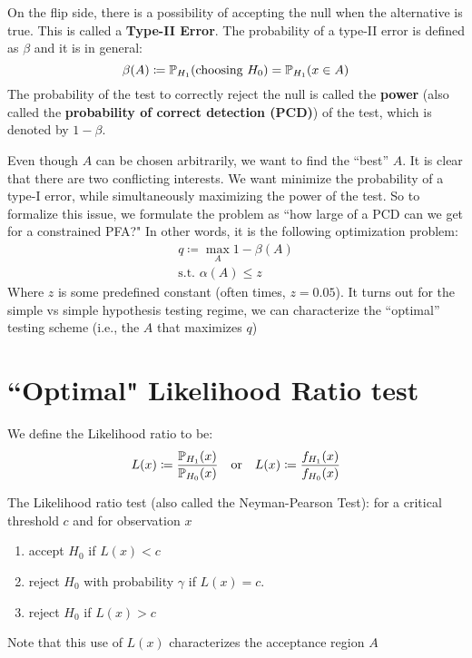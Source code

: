 \documentclass{article}
\begin{document}
On the flip side, there is a possibility of accepting the null when the alternative is true. This is called a \textbf{Type-II Error}. The probability of a type-II error is defined as $\beta$ and it is in general:
\[
\beta(A) \coloneqq \operatorname{\mathbb{P}}_{H_1}(\text{choosing } H_0) = \operatorname{\mathbb{P}}_{H_1}(x \in A)
\]
The probability of the test to correctly reject the null is called the \textbf{power} (also called the \textbf{probability of correct detection (PCD)}) of the test, which is denoted by $1-\beta$.

Even though $A$ can be chosen arbitrarily, we want to find the ``best'' $A$. It is clear that there are two conflicting interests. We want minimize the probability of a type-I error, while simultaneously maximizing the power of the test. So to formalize this issue, we formulate the problem as ``how large of a PCD can we get for a constrained PFA?" In other words, it is the following optimization problem:
\begin{gather}
q\coloneqq \max_{A} 1 - \beta(A)\label{ogmain}\\
\text{s.t. } \alpha(A) \leq z\nonumber
\end{gather}
Where $z$ is some predefined constant (often times, $z = 0.05$). It turns out for the simple vs simple hypothesis testing regime, we can characterize the ``optimal'' testing scheme (i.e., the $A$ that maximizes $q$)

\section{``Optimal" Likelihood Ratio test}
\begin{mydef}
We define the Likelihood ratio to be:
\begin{align*}
L(x) \coloneqq \frac{\operatorname{\mathbb{P}}_{H_1}(x)}{\operatorname{\mathbb{P}}_{H_0}(x)} \quad \text{or} \quad L(x) \coloneqq \frac{f_{H_1}(x)}{f_{H_0}(x)} 
\end{align*}
\end{mydef}

\begin{mydef}
\label{test}
The Likelihood ratio test (also called the Neyman-Pearson Test): for a critical threshold $c$ and for observation $x$
\begin{enumerate}
    \item accept $H_0$ if $L(x) < c$
    \item reject $H_0$ with probability $\gamma$ if $L(x) = c$.
    \item reject $H_0$ if $L(x) > c$
\end{enumerate}
Note that this use of $L(x)$ characterizes the acceptance region $A$
\end{mydef}
\end{document}

